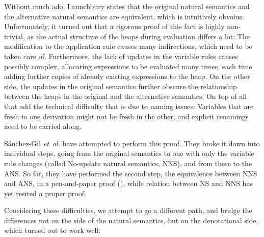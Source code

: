 \documentclass{jfp1}
\theoremstyle{nonumberbreak}
\begin{document}
Without much ado, Launchbury states that the original natural semantics and the alternative natural semantics are equivalent, which is intuitively obvoius. Unfortunately, it turned out that a rigorous proof of this fact is highly non-trivial, as the actual structure of the heaps during evaluation differs a lot: The modification to the application rule causes many indirections, which need to be taken care of. Furthermore, the lack of updates in the variable rules causes possibly complex, allocating expressions to be evaluated many times, each time adding further copies of already existing expressions to the heap. On the other side, the updates in the original semantics further obscure the relationship between the heaps in the original and the alternative semantics. On top of all that add the technical difficulty that is due to naming issues: Variables that are fresh in one derivation might not be fresh in the other, and explicit renamings need to be carried along.

S{\'a}nchez-Gil {\em et~al.} have attempted to perform this proof. They broke it down into individual steps, going from the original semantics to one with only the variable rule changes (called No-update natural semantics, NNS), and from there to the ANS. So far, they have performed the second step, the equivalence between NNS and ANS, in a pen-and-paper proof (), while relation between NS and NNS has yet resited a proper proof.

Considering these difficulties, we attempt to go a different path, and bridge the differences not on the side of the natural semantics, but on the denotational side, which turned out to work well:
\end{document}
